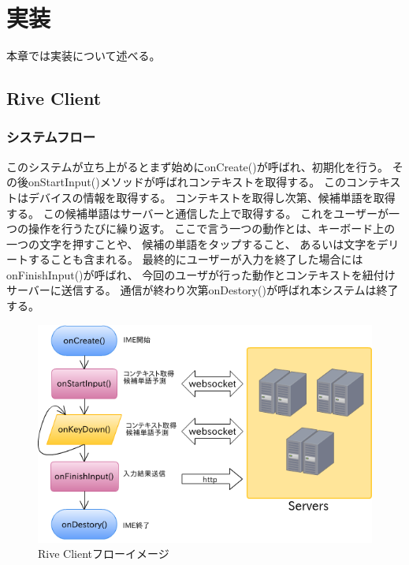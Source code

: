 \chapter{実装}
\label{implementation}
本章では実装について述べる。

\newpage
\section{Rive Client}
\label{sec:riveclient}
\subsection{システムフロー}

このシステムが立ち上がるとまず始めにonCreate()が呼ばれ、初期化を行う。
その後onStartInput()メソッドが呼ばれコンテキストを取得する。
このコンテキストはデバイスの情報を取得する。
コンテキストを取得し次第、候補単語を取得する。
この候補単語はサーバーと通信した上で取得する。
これをユーザーが一つの操作を行うたびに繰り返す。
ここで言う一つの動作とは、キーボード上の一つの文字を押すことや、
候補の単語をタップすること、
あるいは文字をデリートすることも含まれる。
最終的にユーザーが入力を終了した場合にはonFinishInput()が呼ばれ、
今回のユーザが行った動作とコンテキストを紐付けサーバーに送信する。
通信が終わり次第onDestory()が呼ばれ本システムは終了する。

\begin{figure}[htbp]
  \begin{center}
    \includegraphics[width=14cm,bb=0 0 562 366]{images/clientflow}
  \end{center}
  \caption{Rive Clientフローイメージ}
  \label{fig:clientflow}
\end{figure}

